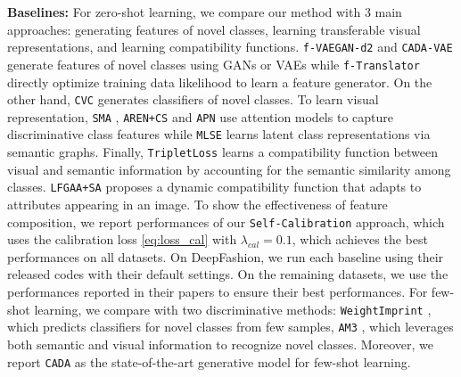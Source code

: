 \documentclass[10pt,journal,compsoc]{IEEEtran}
\newcommand{\1}{\boldsymbol{1}}
\newcommand{\0}{\boldsymbol{0}}
\newcommand{\<}{\langle}
\renewcommand{\>}{\rangle}
\newcommand{\myparagraph}[1]{\vspace{-2pt}\medskip\noindent\textbf{#1}}
\begin{document}
\myparagraph{Baselines:} 
For zero-shot learning, we compare our method with 3 main approaches: generating features of novel classes, learning transferable visual representations, and learning compatibility functions. \texttt{f-VAEGAN-d2} \cite{Xian:CVPR19} and \texttt{CADA-VAE} \cite{Schonfeld:CVPR19} generate features of novel classes using GANs or VAEs while \texttt{f-Translator} \cite{Zhu:ICCV19} directly optimize training data likelihood to learn a feature generator. On the other hand, \texttt{CVC} \cite{Li:ICCV19} generates classifiers of novel classes.
To learn visual representation, \texttt{SMA} \cite{Yu:NIPS18}, \texttt{AREN+CS} \cite{Xie:CVPR19} and \texttt{APN} \cite{Xu:NeurIPS20} use attention models to capture discriminative class features while \texttt{MLSE} \cite{Ding:CVPR19} learns latent class representations via semantic graphs.
Finally, \texttt{TripletLoss} \cite{Cacheux:ICCV19} learns a compatibility function between visual and semantic information by accounting for the semantic similarity among classes. \texttt{LFGAA+SA} \cite{Liu:ICCV19} proposes a dynamic compatibility function that adapts to attributes appearing in an image.
To show the effectiveness of feature composition, we report performances of our \texttt{Self-Calibration} approach, which uses the calibration loss \eqref{eq:loss_cal} with $\lambda_{cal}=0.1$, which achieves the best performances on all datasets. 
On DeepFashion, we run each baseline using their released codes with their default settings. On the remaining datasets, we use the performances reported in their papers to ensure their best performances.
For few-shot learning, we compare with two discriminative methods: \texttt{WeightImprint} \cite{Qi:CVPR18}, which predicts classifiers for novel classes from few samples, \texttt{AM3} \cite{Xing:NeurIPS19}, which leverages both semantic and visual information to recognize novel classes.
Moreover, we report \texttt{CADA} as the state-of-the-art generative model for few-shot learning.  
\end{document}
